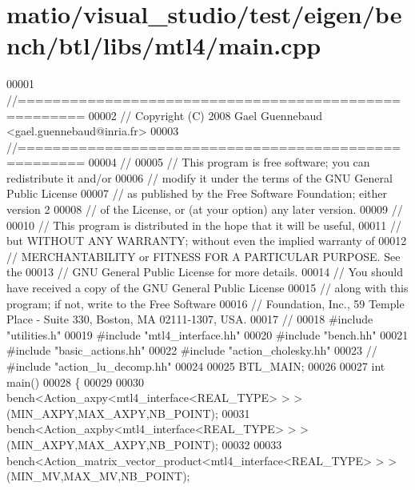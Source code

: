 \hypertarget{matio_2visual__studio_2test_2eigen_2bench_2btl_2libs_2mtl4_2main_8cpp_source}{}\section{matio/visual\+\_\+studio/test/eigen/bench/btl/libs/mtl4/main.cpp}
\label{matio_2visual__studio_2test_2eigen_2bench_2btl_2libs_2mtl4_2main_8cpp_source}

\begin{DoxyCode}
00001 \textcolor{comment}{//=====================================================}
00002 \textcolor{comment}{// Copyright (C) 2008 Gael Guennebaud <gael.guennebaud@inria.fr>}
00003 \textcolor{comment}{//=====================================================}
00004 \textcolor{comment}{//}
00005 \textcolor{comment}{// This program is free software; you can redistribute it and/or}
00006 \textcolor{comment}{// modify it under the terms of the GNU General Public License}
00007 \textcolor{comment}{// as published by the Free Software Foundation; either version 2}
00008 \textcolor{comment}{// of the License, or (at your option) any later version.}
00009 \textcolor{comment}{//}
00010 \textcolor{comment}{// This program is distributed in the hope that it will be useful,}
00011 \textcolor{comment}{// but WITHOUT ANY WARRANTY; without even the implied warranty of}
00012 \textcolor{comment}{// MERCHANTABILITY or FITNESS FOR A PARTICULAR PURPOSE.  See the}
00013 \textcolor{comment}{// GNU General Public License for more details.}
00014 \textcolor{comment}{// You should have received a copy of the GNU General Public License}
00015 \textcolor{comment}{// along with this program; if not, write to the Free Software}
00016 \textcolor{comment}{// Foundation, Inc., 59 Temple Place - Suite 330, Boston, MA  02111-1307, USA.}
00017 \textcolor{comment}{//}
00018 \textcolor{preprocessor}{#include "utilities.h"}
00019 \textcolor{preprocessor}{#include "mtl4\_interface.hh"}
00020 \textcolor{preprocessor}{#include "bench.hh"}
00021 \textcolor{preprocessor}{#include "basic\_actions.hh"}
00022 \textcolor{preprocessor}{#include "action\_cholesky.hh"}
00023 \textcolor{comment}{// #include "action\_lu\_decomp.hh"}
00024 
00025 BTL\_MAIN;
00026 
00027 \textcolor{keywordtype}{int} main()
00028 \{
00029 
00030   bench<Action\_axpy<mtl4\_interface<REAL\_TYPE> > >(MIN\_AXPY,MAX\_AXPY,NB\_POINT);
00031   bench<Action\_axpby<mtl4\_interface<REAL\_TYPE> > >(MIN\_AXPY,MAX\_AXPY,NB\_POINT);
00032 
00033   bench<Action\_matrix\_vector\_product<mtl4\_interface<REAL\_TYPE> > >(MIN\_MV,MAX\_MV,NB\_POINT);

\end{DoxyCode}
